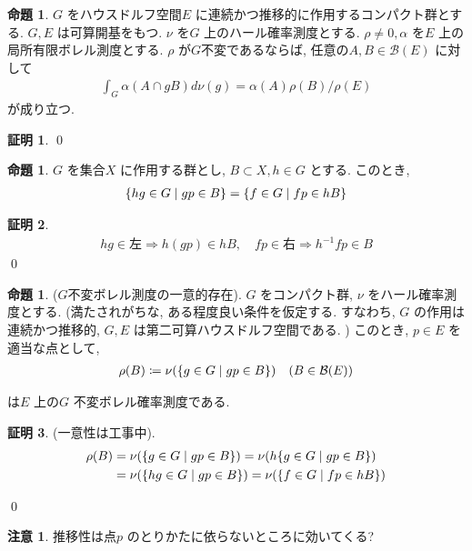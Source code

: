 \documentclass[10pt, fleqn, label-section=none]{bxjsarticle}
\theoremstyle{definition}
\newtheorem{prop}[dfn]{命題}
\newtheorem*{pf*}{証明}
\newtheorem{remark}[dfn]{注意}
\newcommand{\cbra}[1]{\mleft\{#1\mright\}}
\newcommand{\naraba}{\Rightarrow}
\renewcommand{\;}{\, ; \,}
\begin{document}
\begin{prop}$G$ をハウスドルフ空間$E$ に連続かつ推移的に作用するコンパクト群とする. $G, E$ は可算開基をもつ. $\nu$ を$G$ 上のハール確率測度とする. $\rho \neq 0, \alpha $ を$E$ 上の局所有限ボレル測度とする. $\rho$ が$G$不変であるならば, 任意の$A, B \in \mathcal B (E) $ に対して
\begin{align*} \int_G \alpha(A \cap gB) d\nu(g) = \alpha (A) \rho(B) / \rho (E)  \end{align*} 
が成り立つ. 
\end{prop}
\begin{pf*}




\qed
\end{pf*}

\begin{prop}$G$ を集合$X$ に作用する群とし, $B \subset X, h \in G$ とする. このとき, 
\begin{align*} \cbra{hg \in G \mid gp \in B } = \cbra{f \in G \mid fp \in hB }\end{align*}
\end{prop}
\begin{pf*}
\begin{align*} hg \in \textrm{左} \naraba h(gp) \in hB , \quad
fp \in \textrm{右} \naraba h^{-1} fp \in B
\end{align*}
\qed
\end{pf*}



\begin{prop}($G$不変ボレル測度の一意的存在). $G$ をコンパクト群, $\nu$ をハール確率測度とする. (満たされがちな, ある程度良い条件を仮定する. すなわち, $G$ の作用は連続かつ推移的, $G, E$ は第二可算ハウスドルフ空間である. ) このとき, $p \in E$ を適当な点として, 
\begin{align*} \rho(B) \coloneqq \nu (\cbra{g \in G \mid gp \in B})      \quad (B \in \mathcal B (E) ) \end{align*}

は$E$ 上の$G$ 不変ボレル確率測度である. 
\end{prop}
\begin{pf*}(一意性は工事中). 
\begin{align*} \rho(B) &= \nu (  \cbra{g \in G \mid gp \in B}   ) = \nu(h  \cbra{g \in G \mid gp \in B} )   \\
&= \nu(  \cbra{h g \in G \mid gp \in B} ) = \nu(  \cbra{f \in G \mid fp \in hB} ) 
\end{align*}

\qed
\end{pf*}

\begin{remark}推移性は点$p$ のとりかたに依らないところに効いてくる? 

\end{remark}
\end{document}
